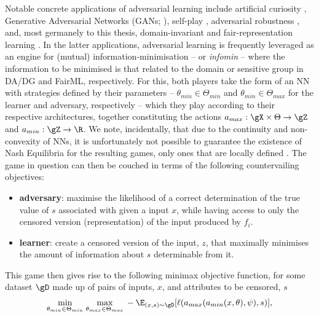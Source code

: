 Notable concrete applications of adversarial learning include artificial curiosity
\citep{schmidhuber1992learning}, Generative Adversarial Networks (GANs;
\cite{goodfellow14generative}), self-play \citep{silver2018general}, adversarial robustness
\citep{szegedy2013intriguing}, and, most germanely to this thesis, domain-invariant
\citep{ganin2016domain, zhao2019learning} and fair-representation learning
\citep{edwards2015censoring, madras2018learning}.
%
%
In the latter applications, adversarial learning is frequently leveraged as an engine for
(mutual) information-minimisation -- or \emph{infomin} -- where the information to be minimised is that
related to the domain or sensitive group in DA/DG and FairML, respectively.
%
For this, both players take the form of an NN with strategies defined by their parameters --
\(\theta_{min} \in \Theta_{min}\) and \(\theta_{min} \in \Theta_{max}\) for the learner and
adversary, respectively -- which they play according to their respective architectures, together
constituting the actions \(a_{max}: \gX \times \Theta \to \gZ \) and \(a_{min}: \gZ \time \Psi \to
\R \).
%
We note, incidentally, that due to the continuity and non-convexity of NNs, it is unfortunately not
possible to guarantee the existence of Nash Equilibria for the resulting games, only ones that are
locally defined \citep{unterthiner2018coulomb}.
%
The game in question can then be couched in terms of the following countervailing objectives:
%
\begin{itemize}
  \item \textbf{adversary}: maximise the likelihood of a correct determination of the true value of
    \(s\) associated with given a input \(x\), while having access to only the censored version
    (representation) of the input produced by \(f_i\).
  \item \textbf{learner}: create a censored version of the input, \(z\), that maximally minimises the
    amount of information about \(s\) determinable from it. 
\end{itemize}
%
This game then gives rise to the following minimax objective function, for some dataset \(\gD\)
made up of pairs of inputs, \(x\), and attributes to be censored, \(s\)
%
\begin{align}
  \underset{\theta_{min} \in \Theta_{min}}{\text{min}}\; \underset{\theta_{max} \in
  \Theta_{max}}{\text{max}}\,
%
-\E_{(x, s) \sim \gD} [ \ell(a_{max}( a_{min}(x, \theta), \psi ), s ) ],
%
\label{eq:adv-infomin}
\end{align}
